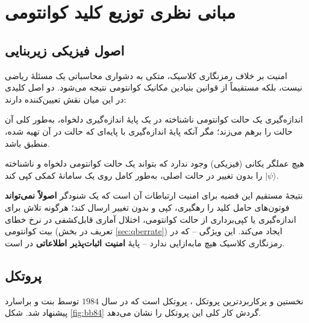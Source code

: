 \chapter{مبانی نظری توزیع کلید کوانتومی}
\label{chap:qkdtheory}

\section{اصول فیزیکی زیربنایی}

امنیت  بر خلاف رمزنگاری کلاسیک، متکی به دشواری محاسباتی یک مسئلهٔ ریاضی نیست، بلکه مستقیماً از قوانین بنیادین مکانیک کوانتومی نتیجه می‌شود. دو اصل کلیدی در این میان نقش تعیین‌کننده دارند:

\begin{definition}
اندازه‌گیری یک حالت کوانتومی ناشناخته در یک پایهٔ اندازه‌گیری دلخواه، به‌طور کلی آن حالت را برهم می‌زند؛ مگر آنکه پایهٔ اندازه‌گیری با پایه‌ای که حالت در آن تهیه شده، منطبق باشد.
\end{definition}

\begin{theorem}
هیچ عملگر یکانی (فیزیکی) وجود ندارد که بتواند یک حالت کوانتومی دلخواه و ناشناخته $\lvert\psi\rangle$ را بدون تغییر در حالت اصلی، به‌طور کامل روی یک سامانهٔ کمکی کپی کند.
\end{theorem}

نتیجهٔ مستقیم این قضیه برای امنیت ارتباطات آن است که یک شنودگر  \textbf{اصولاً نمی‌تواند} فوتون‌های حامل کلید را رهگیری، کپی و بدون تغییر ارسال کند؛ هرگونه تلاش برای اندازه‌گیری یا کپی‌برداری از حالت کوانتومی، اختلال آماری قابل‌کشفی در نرخ خطای بیت کوانتومی (تعریف در بخش \ref{sec:qberrate}) ایجاد می‌کند. این ویژگی -- که در رمزنگاری کلاسیک هیچ مابه‌ازایی ندارد -- پایهٔ \textbf{امنیت اثبات‌پذیر اطلاعاتی}  در  است.

\section{پروتکل }

نخستین و پرکاربردترین پروتکل ، پروتکل  است که در سال $1984$ توسط بنت و براسارد  پیشنهاد شد. شکل \ref{fig:bb84} گردش کار کلی این پروتکل را نشان می‌دهد.

